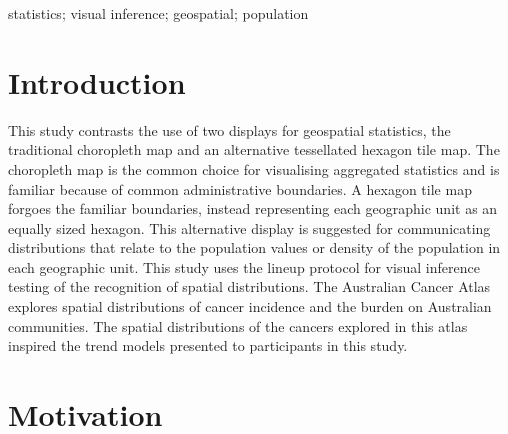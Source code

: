 \documentclass[conference,final,]{IEEEtran}
\begin{document}
\begin{IEEEkeywords}
statistics; visual inference; geospatial; population
\end{IEEEkeywords}




\maketitle


%
\IEEEpeerreviewmaketitle


\hypertarget{introduction}{%
\section{Introduction}\label{introduction}}

This study contrasts the use of two displays for geospatial statistics,
the traditional choropleth map and an alternative tessellated hexagon
tile map. The choropleth map is the common choice for visualising
aggregated statistics and is familiar because of common administrative
boundaries. A hexagon tile map forgoes the familiar boundaries, instead
representing each geographic unit as an equally sized hexagon. This
alternative display is suggested for communicating distributions that
relate to the population values or density of the population in each
geographic unit. This study uses the lineup protocol for visual
inference testing of the recognition of spatial distributions. The
Australian Cancer Atlas explores spatial distributions of cancer
incidence and the burden on Australian communities. The spatial
distributions of the cancers explored in this atlas inspired the trend
models presented to participants in this study.

\hypertarget{motivation}{%
\section{Motivation}\label{motivation}}
\end{document}
